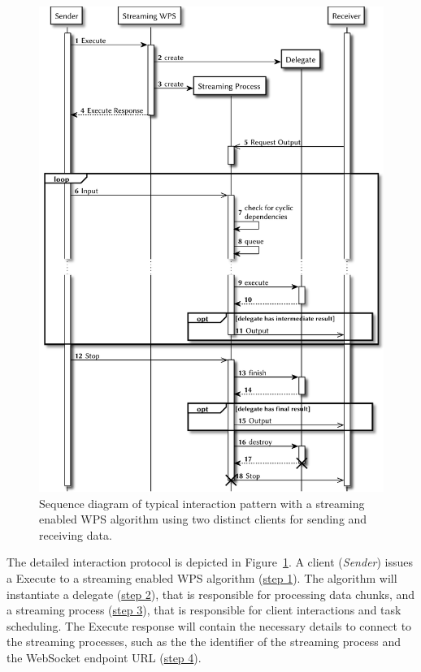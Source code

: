 	\begin{figure}[!htb]
		\centering
		\includegraphics[width=.7868\textwidth]{figures/sequence-diagramm-swps.pdf} %
		\caption{\label{fig:sd:swps} Sequence diagram of typical interaction pattern with a streaming enabled WPS algorithm using two distinct clients for sending and receiving data.}
	\end{figure}

	The detailed interaction protocol is depicted in Figure~\ref{fig:sd:swps}. A client (\emph{Sender}) issues a Execute to a streaming enabled WPS algorithm (\hyperref[fig:sd:swps]{step 1}). The algorithm will instantiate a delegate (\hyperref[fig:sd:swps]{step 2}), that is responsible for processing data chunks, and a streaming process (\hyperref[fig:sd:swps]{step 3}), that is responsible for client interactions and task scheduling. The Execute response will contain the necessary details to connect to the streaming processes, such as the the identifier of the streaming process and the WebSocket endpoint URL (\hyperref[fig:sd:swps]{step 4}).

